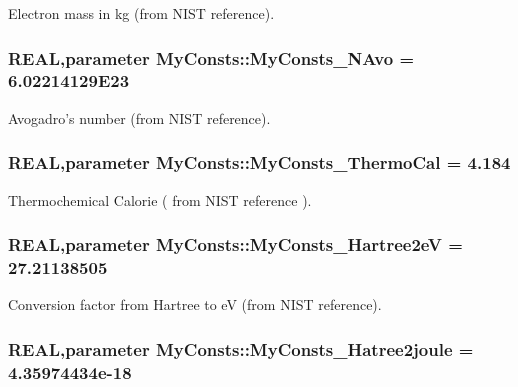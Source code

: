 Electron mass in kg (from NIST reference). \hypertarget{namespace_my_consts_a9d0cf18aaa762022e93aa97d649e6cbd}{
\subsubsection[{MyConsts\_\-NAvo}]{\setlength{\rightskip}{0pt plus 5cm}REAL,parameter {\bf MyConsts::MyConsts\_\-NAvo} = 6.02214129E23}}
\label{namespace_my_consts_a9d0cf18aaa762022e93aa97d649e6cbd}


Avogadro's number (from NIST reference). \hypertarget{namespace_my_consts_ac5ba183f9282fe2c8554f8b9f5c7d5d1}{
\subsubsection[{MyConsts\_\-ThermoCal}]{\setlength{\rightskip}{0pt plus 5cm}REAL,parameter {\bf MyConsts::MyConsts\_\-ThermoCal} = 4.184}}
\label{namespace_my_consts_ac5ba183f9282fe2c8554f8b9f5c7d5d1}


Thermochemical Calorie ( from NIST reference ). \hypertarget{namespace_my_consts_aa924b16cd5b1a897d1d3983c45adca62}{
\subsubsection[{MyConsts\_\-Hartree2eV}]{\setlength{\rightskip}{0pt plus 5cm}REAL,parameter {\bf MyConsts::MyConsts\_\-Hartree2eV} = 27.21138505}}
\label{namespace_my_consts_aa924b16cd5b1a897d1d3983c45adca62}


Conversion factor from Hartree to eV (from NIST reference). \hypertarget{namespace_my_consts_aaa4538847321d2d0c658c076868a98e6}{
\subsubsection[{MyConsts\_\-Hatree2joule}]{\setlength{\rightskip}{0pt plus 5cm}REAL,parameter {\bf MyConsts::MyConsts\_\-Hatree2joule} = 4.35974434e-\/18}}
\label{namespace_my_consts_aaa4538847321d2d0c658c076868a98e6}


